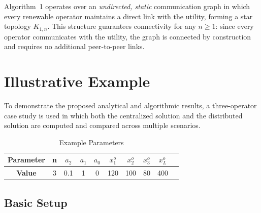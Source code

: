 \documentclass[journal]{IEEEtran}
\begin{document}
Algorithm~1 operates over an \emph{undirected, static} communication graph in which every renewable operator maintains a direct link with the utility, forming a star topology $K_{1,n}$. This structure guarantees connectivity for any $n \geq 1$: since every operator communicates with the utility, the graph is connected by construction and requires no additional peer-to-peer links. 

\section{Illustrative Example \label{sec:examples}}

To demonstrate the proposed analytical and algorithmic results, a three-operator case study is used in which both the centralized solution and the distributed solution are computed and compared across multiple scenarios.

\begin{table}[hbt!]
\centering
\vspace*{-0.1in}
\caption{Example Parameters}
\label{tab:example_params}
\begin{tabular}{|c||c||c|c|c||c|c|c||c|c|}
\hline
\textbf{Parameter} & n & $a_2$ & $a_1$ & $a_0$ & $x_1^o$ & $x_2^o$ & $x_3^o$ & $x_L^o$ \\ \hline
\textbf{Value} &  $3$ &  0.1 & 1 & 0 & 120 & 100 & 80 & 400 \\
\hline
\end{tabular}
\end{table}

\subsection{Basic Setup}
\end{document}

